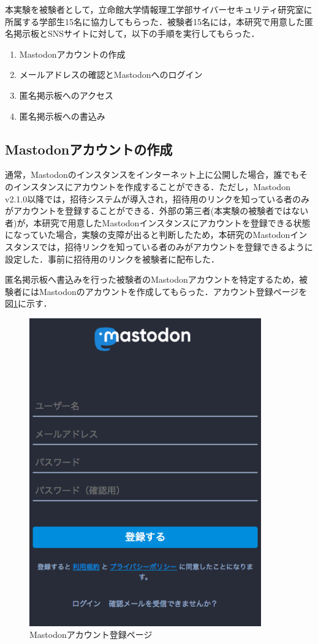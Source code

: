 \documentclass[10pt, a4paper]{jreport}
\begin{document}
本実験を被験者として，立命館大学情報理工学部サイバーセキュリティ研究室に所属する学部生15名に協力してもらった．被験者15名には，本研究で用意した匿名掲示板とSNSサイトに対して，以下の手順を実行してもらった．

\begin{enumerate}
\item{Mastodonアカウントの作成}
\item{メールアドレスの確認とMastodonへのログイン}
\item{匿名掲示板へのアクセス}
\item{匿名掲示板への書込み}
\end{enumerate}

\subsection{Mastodonアカウントの作成}
通常，Mastodonのインスタンスをインターネット上に公開した場合，誰でもそのインスタンスにアカウントを作成することができる．ただし，Mastodon v2.1.0以降では，招待システムが導入され，招待用のリンクを知っている者のみがアカウントを登録することができる\cite{invite_system}．外部の第三者(本実験の被験者ではない者)が，本研究で用意したMastodonインスタンスにアカウントを登録できる状態になっていた場合，実験の支障が出ると判断したため，本研究のMastodonインスタンスでは，招待リンクを知っている者のみがアカウントを登録できるように設定した．事前に招待用のリンクを被験者に配布した．

匿名掲示板へ書込みを行った被験者のMastodonアカウントを特定するため，被験者にはMastodonのアカウントを作成してもらった．アカウント登録ページを図\ref{fig: account_registration}に示す．

\begin{figure}[H]
	\begin{center}
		\includegraphics[width=100mm]{figures/account_registration_screenshot.png}
	\end{center}
	\caption{Mastodonアカウント登録ページ}
	\label{fig: account_registration}
\end{figure}
\end{document}

